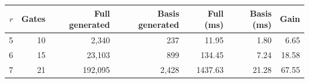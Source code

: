 \begin{tabular}{rrrrrrr}
\toprule
$r$ & Gates & Full generated & Basis generated & Full (ms) & Basis (ms) & Gain \\
\midrule
5 & 10 & 2,340 & 237 & 11.95 & 1.80 & 6.65 \\
6 & 15 & 23,103 & 899 & 134.45 & 7.24 & 18.58 \\
7 & 21 & 192,095 & 2,428 & 1437.63 & 21.28 & 67.55 \\
\bottomrule
\end{tabular}
